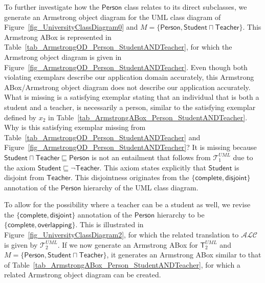 \documentclass{amsart}
\begin{document}
       To further investigate how the $\mathsf{Person}$ class relates to its direct subclasses, we generate an Armstrong object diagram for the UML class diagram of Figure~\ref{fig_UniversityClassDiagram0} and $M = \{\mathsf{Person}, \mathsf{Student} \sqcap \mathsf{Teacher}\}$.
      This Armstrong ABox is represented in Table~\ref{tab_ArmstrongOD_Person_StudentANDTeacher}, for which the Armstrong object diagram is given in Figure~\ref{fig_ArmstrongOD_Person_StudentANDTeacher}. Even though both violating exemplars describe our application domain accurately, this Armstrong ABox/Armstrong object diagram does not describe our application accurately. What is missing is a satisfying exemplar stating that an individual that is both a student and a teacher, is necessarily a person, similar to the satisfying exemplar defined by $x_2$ in Table~\ref{tab_ArmstrongABox_Person_StudentANDTeacher}. Why is this satisfying exemplar missing from Table~\ref{tab_ArmstrongOD_Person_StudentANDTeacher} and Figure~\ref{fig_ArmstrongOD_Person_StudentANDTeacher}? It is missing because $\mathsf{Student} \sqcap \mathsf{Teacher} \sqsubseteq \mathsf{Person}$ is not an entailment that follows from $\mathcal{T}_1^{UML}$ due to the axiom $\mathsf{Student} \sqsubseteq \neg \mathsf{Teacher}$. This axiom states explicitly that $\mathsf{Student}$ is disjoint from $\mathsf{Teacher}$. This disjointness originates from the $\{\mathsf{complete}, \mathsf{disjoint}\}$ annotation of the $\mathsf{Person}$ hierarchy of the UML class diagram.    

       To allow for the possibility where a teacher can be a student as well, we revise the $\{\mathsf{complete}, \mathsf{disjoint}\}$ annotation of the $\mathsf{Person}$ hierarchy to be $\{\mathsf{complete}, \mathsf{overlapping}\}$. This is illustrated in Figure~\ref{fig_UniversityClassDiagram2}, for which the related translation to $\mathcal{ALC}$ is given by $\mathcal{T}_2^{UML}$. If we now generate an Armstrong ABox for $\mathsf{T}_2^{UML}$ and $M = \{\mathsf{Person}, \mathsf{Student} \sqcap \mathsf{Teacher}\}$, it generates an Armstrong ABox similar to that of Table~\ref{tab_ArmstrongABox_Person_StudentANDTeacher}, for which a related Armstrong object diagram can be created.
\end{document}
